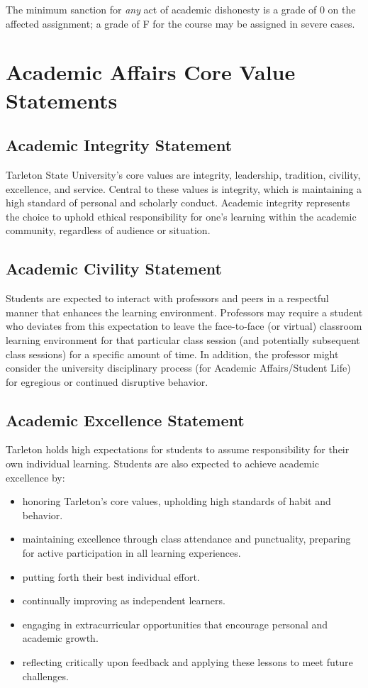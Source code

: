\documentclass[10pt]{article}
\begin{document}
The minimum sanction for \emph{any} act of academic dishonesty is a grade of 0 on the affected assignment; a grade of F for the course may be assigned in severe cases.

\section*{Academic Affairs Core Value Statements}
\label{sec:org2a02a1b}
\subsection*{Academic Integrity Statement}
\label{sec:orgb7302a5}
Tarleton State University's core values are integrity, leadership, tradition, civility, excellence, and service.  Central to these values is integrity, which is maintaining a high standard of personal and scholarly conduct.  Academic integrity represents the choice to uphold ethical responsibility for one’s learning within the academic community, regardless of audience or situation.

\subsection*{Academic Civility Statement}
\label{sec:orgead6dc3}
Students are expected to interact with professors and peers in a respectful manner that enhances the learning environment. Professors may require a student who deviates from this expectation to leave the face-to-face (or virtual) classroom learning environment for that particular class session (and potentially subsequent class sessions) for a specific amount of time. In addition, the professor might consider the university disciplinary process (for Academic Affairs/Student Life) for egregious or continued disruptive behavior.

\subsection*{Academic Excellence Statement}
\label{sec:org67b6903}
Tarleton holds high expectations for students to assume responsibility for their own individual learning. Students are also expected to achieve academic excellence by:
\begin{itemize}
\item honoring Tarleton’s core values, upholding high standards of habit and behavior.
\item maintaining excellence through class attendance and punctuality, preparing for active participation in all learning experiences.
\item putting forth their best individual effort.
\item continually improving as independent learners.
\item engaging in extracurricular opportunities that encourage personal and academic growth.
\item reflecting critically upon feedback and applying these lessons to meet future challenges.
\end{itemize}
\end{document}
